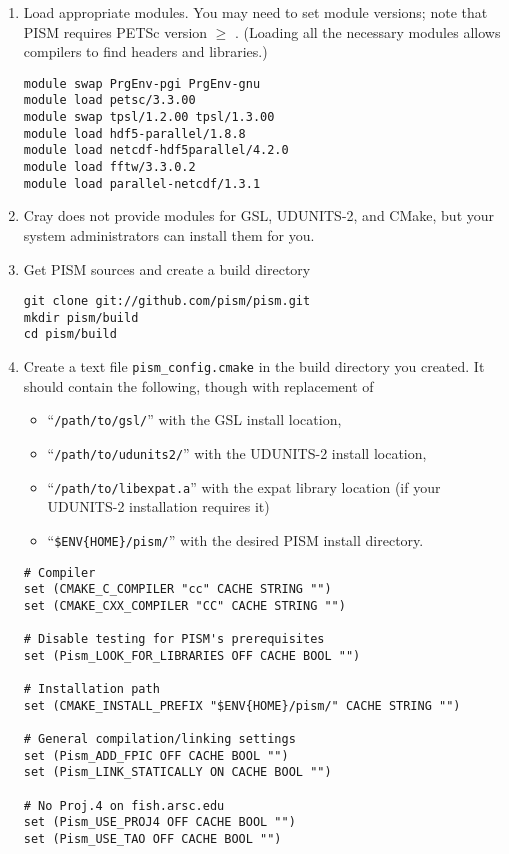 \documentclass[titlepage,letterpaper,final]{scrartcl}
\begin{document}
\begin{enumerate}
\item Load appropriate modules. You may need to set module versions; note that
  PISM requires PETSc version $\ge$ \PETSCREL. (Loading all the necessary
  modules allows compilers to find headers and libraries.)
\begin{verbatim}
module swap PrgEnv-pgi PrgEnv-gnu
module load petsc/3.3.00
module swap tpsl/1.2.00 tpsl/1.3.00
module load hdf5-parallel/1.8.8
module load netcdf-hdf5parallel/4.2.0
module load fftw/3.3.0.2
module load parallel-netcdf/1.3.1
\end{verbatim}
\item Cray does not provide modules for GSL, UDUNITS-2, and CMake, but your system administrators can install them for you.
\item Get PISM sources and create a build directory
\begin{verbatim}
git clone git://github.com/pism/pism.git
mkdir pism/build
cd pism/build
\end{verbatim}
\item
Create a text file \texttt{pism_config.cmake} in the build directory you
created. It should contain the following, though with replacement of
\begin{itemize}
\item ``\texttt{/path/to/gsl/}'' with the GSL install location,
\item ``\texttt{/path/to/udunits2/}'' with the UDUNITS-2 install location,
\item ``\texttt{/path/to/libexpat.a}'' with the expat library location
  (if your UDUNITS-2 installation requires it)
\item ``\texttt{\$ENV\{HOME\}/pism/}'' with the desired PISM install directory.
\end{itemize}

\begin{verbatim}
# Compiler
set (CMAKE_C_COMPILER "cc" CACHE STRING "")
set (CMAKE_CXX_COMPILER "CC" CACHE STRING "")

# Disable testing for PISM's prerequisites
set (Pism_LOOK_FOR_LIBRARIES OFF CACHE BOOL "")

# Installation path
set (CMAKE_INSTALL_PREFIX "$ENV{HOME}/pism/" CACHE STRING "")

# General compilation/linking settings
set (Pism_ADD_FPIC OFF CACHE BOOL "")
set (Pism_LINK_STATICALLY ON CACHE BOOL "")

# No Proj.4 on fish.arsc.edu
set (Pism_USE_PROJ4 OFF CACHE BOOL "")
set (Pism_USE_TAO OFF CACHE BOOL "")


\end{verbatim}
\end{enumerate}
\end{document}
